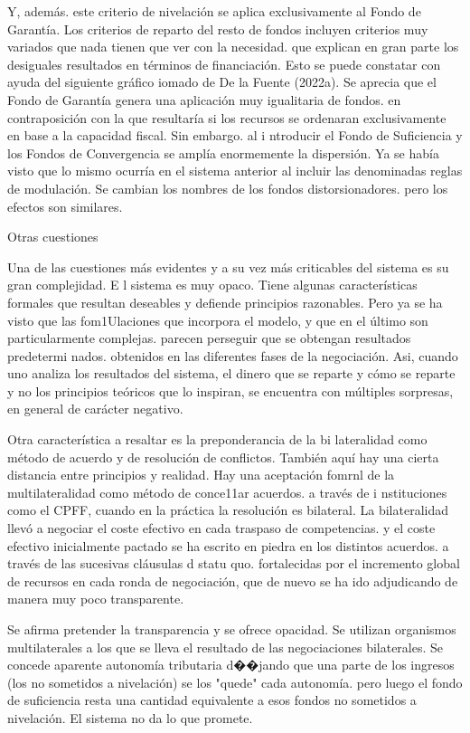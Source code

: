 \documentclass[10pt,a4paper]{article}
\begin{document}
Y, además. este criterio de nivelación se aplica exclusivamente al Fondo de Garantía. Los criterios de reparto del resto de fondos incluyen criterios muy variados que nada tienen que ver con la necesidad. que explican en gran parte los desiguales resultados en términos de financiación. Esto se puede constatar con ayuda del siguiente gráfico iomado de De la Fuente (2022a). Se aprecia que el Fondo de Garantía genera una aplicación muy igualitaria de fondos. en contraposición con la que resultaría si los recursos se ordenaran exclusivamente en base a la capacidad fiscal. Sin embargo. al i ntroducir el Fondo de Suficiencia y los Fondos de Convergencia se amplía enormemente la dispersión. Ya se había visto que lo mismo ocurría en el sistema anterior al incluir las denominadas reglas de modulación. Se cambian los nombres de los fondos distorsionadores. pero los efectos son similares.

Otras cuestiones

Una de las cuestiones más evidentes y a su vez más criticables del sistema es su gran complejidad. E l sistema es muy opaco. Tiene algunas características formales que resultan deseables y defiende principios razonables. Pero ya se ha visto que las fom1Ulaciones que incorpora el modelo, y que en el último son particularmente complejas. parecen perseguir que se obtengan resultados predetermi nados. obtenidos en las diferentes fases de la negociación. Asi, cuando uno analiza los resultados del sistema, el dinero que se reparte y cómo se reparte y no los principios teóricos que lo inspiran, se encuentra con múltiples sorpresas, en general de carácter negativo.

Otra característica a resaltar es la preponderancia de la bi lateralidad como método de acuerdo y de resolución de conflictos. También aquí hay una cierta distancia entre principios y realidad. Hay una aceptación fomrnl de la multilateralidad como método de conce11ar acuerdos. a través de i nstituciones como el CPFF, cuando en la práctica la resolución es bilateral. La bilateralidad llevó a negociar el coste efectivo en cada traspaso de competencias. y el coste efectivo inicialmente pactado se ha escrito en piedra en los distintos acuerdos. a través de las sucesivas cláusulas d statu quo. fortalecidas por el incremento global de recursos en cada ronda de negociación, que de nuevo se ha ido adjudicando de manera muy poco transparente. 

Se afirma pretender la transparencia y se ofrece opacidad. Se utilizan organismos multilaterales a los que se lleva el resultado de las negociaciones bilaterales. Se concede aparente autonomía tributaria d��jando que una parte de los ingresos (los no sometidos a nivelación) se los "quede" cada autonomía. pero luego el fondo de suficiencia resta una cantidad equivalente a esos fondos no sometidos a nivelación. El sistema no da lo que promete. 
\end{document}
